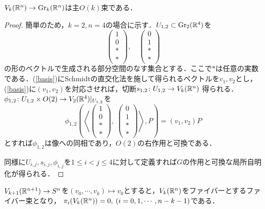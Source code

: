 \begin{prop}
  $V_k(\mathbb{R}^n)\rightarrow \text{Gr}_k(\mathbb{R}^n)$は主$O(k)$束である．
\end{prop}

\begin{proof}
  簡単のため，$k=2,n=4$の場合に示す．$U_{1,2}\subset \text{Gr}_2(\mathbb{R}^4)$を
  \begin{equation}\label{basis}
    \left(\begin{array}{c}
      1\\0\\ * \\ *
    \end{array}\right),\quad \left(\begin{array}{c}
      0\\1\\ * \\ *
    \end{array}\right)
  \end{equation}
  の形のベクトルで生成される部分空間のなす集合とする．ここで$*$は任意の実数である．(\ref{basis})にSchmidtの直交化法を施して得られるベクトルを$v_1,v_2$とし，(\ref{basis})に$(v_1,v_2)$を対応させれば，切断$s_{1,2}\colon U_{1,2}\rightarrow V_k(\mathbb{R}^n)$
  得られる．$\phi_{1,2}\colon U_{1,2}\times O(2)\rightarrow V_{2}(\mathbb{R}^4)|_{U_{1,2}}$を
  \[
  \phi_{1,2}(\left\langle
    \left(\begin{array}{c}
      1\\0\\ * \\ *
    \end{array}\right),\:\left(\begin{array}{c}
      0\\1\\ * \\ *
    \end{array}\right)
  \right\rangle, P) = (v_1,v_2)P
  \]
  とすれば$\phi_{1,2}$は像への同相であり，$O(2)$の右作用と可換である．
  
  同様に$U_{i,j},s_{i,j},\phi_{i,j}$を$1\leq i<j\leq 4$に対して定義すれば$G$の作用と可換な局所自明化が得られる．
\end{proof}

\begin{prop}
  $V_{k+1}(\mathbb{R}^{n+1})\rightarrow S^{n}$を$(v_0,\cdots,v_{k})\mapsto v_{0}$とすると，$V_{k}(\mathbb{R}^{n})$をファイバーとするファイバー束となり，
  $\pi_i(V_k(\mathbb{R}^n))=0, \:(i=0,1,\cdots,n-k-1)$である．
\end{prop}

